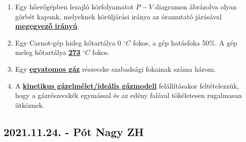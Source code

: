 \documentclass[../../fizika_kerdesek.tex]{subfiles}
\begin{document}
{\begin{enumerate}
                \item Egy hőerőgépben lezajló körfolyamatot $P-V$ diagramon ábrázolva olyan görbét kapunk, melyeknek körüljárási iránya az óramutató járásával \underline{\textbf{megegyező irányú}}.
                \item Egy Carnot-gép hideg hőtartálya 0 ${}^\circ C$ fokos, a gép hatásfoka 50\%. A gép meleg hőtartálya \underline{\textbf{273}} ${}^\circ C$ fokos.
                \item Egy \underline{\textbf{egyatomos gáz}} részecske szabadsági fokainak száma három.
                \item A \underline{\textbf{kinetikus gázelmélet/ideális gázmodell}} felállításakor feltételezzük, hogy a gázrészecskék egymással és az edény falával tökéletesen rugalmasan ütköznek.
            \end{enumerate}}

    \subsection{2021.11.24. - Pót Nagy ZH}
\end{document}
